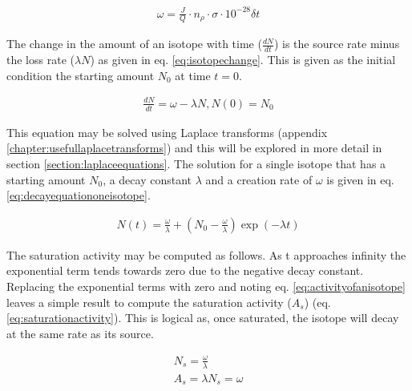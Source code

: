 \begin{equation}
\begin{split}
\omega = \frac{J}{Q} \cdot n_{\rho} \cdot \sigma \cdot 10^{-28} \delta t
\end{split}
\label{eq:reactionrate}
\end{equation}

The change in the amount of an isotope with time ($\frac{dN}{dt}$) is the source rate minus the loss rate ($\lambda N$) as given in eq. \ref{eq:isotopechange}.  This is given as the initial condition the starting amount $N_0$ at time $t = 0$.

\begin{equation}
\begin{split}
\frac{dN}{dt} = \omega - \lambda N, N(0) = N_0
\end{split}
\label{eq:isotopechange}
\end{equation}

This equation may be solved using Laplace transforms (appendix \ref{chapter:usefullaplacetransforms}) and this will be explored in more detail in section \ref{section:laplaceequations}.  The solution for a single isotope that has a starting amount $N_0$, a decay constant $\lambda$ and a creation rate of $\omega$ is given in eq. \ref{eq:decayequationoneisotope}.

\begin{equation}
\begin{split}
N(t) = \frac{\omega}{\lambda} + \left(N_{0} - \frac{\omega}{\lambda} \right) \exp(-\lambda t)
\end{split}
\label{eq:decayequationoneisotope}
\end{equation}

The saturation activity may be computed as follows.  As t approaches infinity the exponential term tends towards zero due to the negative decay constant.  Replacing the exponential terms with zero and noting eq. \ref{eq:activityofanisotope} leaves a simple result to compute the saturation activity ($A_{s}$) (eq. \ref{eq:saturationactivity}).  This is logical as, once saturated, the isotope will decay at the same rate as its source.

\begin{equation}
\begin{split}
N_{s} = \frac{\omega}{\lambda} \\
A_{s} = \lambda N_{s} = \omega \\
\end{split}
\label{eq:saturationactivity}
\end{equation}


